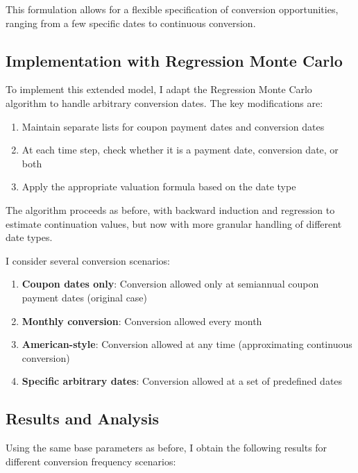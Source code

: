 This formulation allows for a flexible specification of conversion opportunities, ranging from a few specific dates to continuous conversion.

\vspace{1.5cm}

\subsection{Implementation with Regression Monte Carlo}

To implement this extended model, I adapt the Regression Monte Carlo algorithm to handle arbitrary conversion dates. The key modifications are:

\begin{enumerate}
    \item Maintain separate lists for coupon payment dates and conversion dates
    \item At each time step, check whether it is a payment date, conversion date, or both
    \item Apply the appropriate valuation formula based on the date type
\end{enumerate}

The algorithm proceeds as before, with backward induction and regression to estimate continuation values, but now with more granular handling of different date types.

I consider several conversion scenarios:

\begin{enumerate}
    \item \textbf{Coupon dates only}: Conversion allowed only at semiannual coupon payment dates (original case)
    \item \textbf{Monthly conversion}: Conversion allowed every month
    \item \textbf{American-style}: Conversion allowed at any time (approximating continuous conversion)
    \item \textbf{Specific arbitrary dates}: Conversion allowed at a set of predefined dates
\end{enumerate}

\subsection{Results and Analysis}

Using the same base parameters as before, I obtain the following results for different conversion frequency scenarios:

